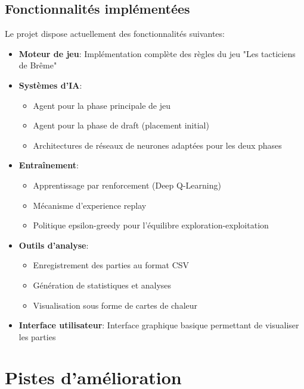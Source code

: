 \documentclass[]{article}
\begin{document}
\subsection{Fonctionnalités implémentées}

Le projet dispose actuellement des fonctionnalités suivantes:

\begin{itemize}
  \item \textbf{Moteur de jeu}: Implémentation complète des règles du jeu "Les tacticiens de Brême"

  \item \textbf{Systèmes d'IA}:
    \begin{itemize}
      \item Agent pour la phase principale de jeu
      \item Agent pour la phase de draft (placement initial)
      \item Architectures de réseaux de neurones adaptées pour les deux phases
    \end{itemize}

  \item \textbf{Entraînement}:
    \begin{itemize}
      \item Apprentissage par renforcement (Deep Q-Learning)
      \item Mécanisme d'experience replay
      \item Politique epsilon-greedy pour l'équilibre exploration-exploitation
    \end{itemize}

  \item \textbf{Outils d'analyse}:
    \begin{itemize}
      \item Enregistrement des parties au format CSV
      \item Génération de statistiques et analyses
      \item Visualisation sous forme de cartes de chaleur
    \end{itemize}

  \item \textbf{Interface utilisateur}: Interface graphique basique permettant de visualiser les parties
\end{itemize}

\section{Pistes d'amélioration}
\end{document}
